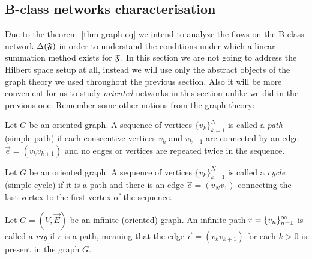 \documentclass[12pt]{article}
\begin{document}
  \subsection{B-class networks characterisation}
    Due to the theorem~\ref{thm-graph-eq} we intend to analyze the flows on the B-class network
      $\Delta(\mathfrak{F})$ in order to understand the conditions under which a linear
      summation method exists for $\mathfrak{F}$.
    In this section we are not going to address the Hilbert space setup at all,
      instead we will use only the abstract objects of the graph theory
      we used throughout the previous section.
    Also it will be more convenient for us to study \emph{oriented} networks in this section unlike we
      did in the previous one.
    Remember some other notions from the graph theory:
    \begin{definition}
      Let $G$ be an oriented graph.
      A sequence of vertices $\{v_k\}_{k=1}^N$ is called a \emph{path} (simple path) if each consecutive vertices
        $v_k$ and $v_{k+1}$ are connected by an edge $\vec{e} = (v_k v_{k+1})$ and no edges or vertices are repeated twice in the sequence.
    \end{definition}
    \begin{definition}
      Let $G$ be an oriented graph.
      A sequence of vertices $\{v_k\}_{k=1}^N$ is called a \emph{cycle} (simple cycle) if it is
        a path and there is an edge $\vec{e} = (v_N v_1)$ connecting the last vertex to the first vertex of the sequence.
    \end{definition}
    \begin{definition}
      Let $G = (V, \vec{E})$ be an infinite (oriented) graph.
      An infinite path $r = \{{v}_n\}_{n=1}^\infty$ is called a \emph{ray} if
      $r$ is a path, meaning that the edge $\vec{e} = (v_k v_{k+1})$ for each $k > 0$ is present in the graph $G$.
    \end{definition}
\end{document}
